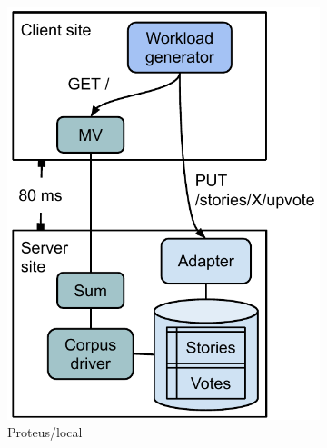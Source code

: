 \begin{figure}[H]
\begin{subfigure}[b]{0.24\textwidth}
            \includegraphics[width=\textwidth]{./figures/evaluation/evaluation_deployments_proteus_local.pdf}
            \caption{Proteus/local}
            \label{fig:deployments_proteus_local}
        \end{subfigure}
        \hfill
        \begin{subfigure}[b]{0.24\textwidth}
            \centering

\end{subfigure}
\end{figure}
